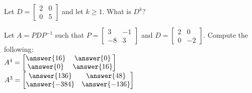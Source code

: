 \documentclass{ximera}
\begin{document}
  	  		      \begin{question} Let $D = \begin{bmatrix} 2 &0\\ 0&5\end{bmatrix}$ and let $k\geq 1$. What is $D^k$?\\
  	  		      	
  	  		      	\begin{multipleChoice}
  	  		      	\end{multipleChoice}
  	  		      	
  	  		      \end{question}	
  	  		       \begin{question} Let $A = PDP^{-1}$ such that $P= \begin{bmatrix} 3 &-1 \\ -8 &3\end{bmatrix}$ and $D = \begin{bmatrix} 2 &0 \\ 0 &-2\end{bmatrix}$. Compute the following:\\ 
  	  		       	
  	  		       	
  	  		       	$A^4 = \begin{bmatrix} \answer{16} &\answer{0}\\\answer{0} &\answer{16}\end{bmatrix}$\\
  	  		       
  	  		       	$A^3 = \begin{bmatrix} \answer{136} &\answer{48}\\\answer{-384} &\answer{-136}\end{bmatrix}$\\	
  	  		       	
  	  		       \end{question}	
\end{document}
